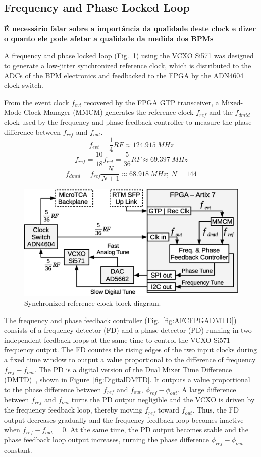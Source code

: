 \documentclass[a4paper,
               biblatex,      %
               ]{jacow}
\begin{document}
\subsection{Frequency and Phase Locked Loop}
 \textbf{É necessário falar sobre a importância da qualidade deste clock e dizer o quanto ele pode afetar a qualidade da medida dos BPMs}
 
 A frequency and phase locked loop (Fig.~\ref{fig:AFCRefClockLoop}) using the VCXO Si571 was designed to generate a low-jitter synchronized reference clock, which is distributed to the ADCs of the BPM electronics and feedbacked to the FPGA by the ADN4604 clock switch.

From the event clock $f_{evt}$ recovered by the FPGA GTP transceiver, a Mixed-Mode Clock Manager (MMCM) generates the reference clock $f_{ref}$ and the $f_{dmtd}$ clock used by the frequency and phase feedback controller to measure the phase difference between $f_{ref}$ and $f_{out}$.
\[f_{evt} = \frac{1}{4}RF \approx 124.915~MHz\]
\[f_{ref} = \frac{10}{18}f_{evt} = \frac{5}{36}RF \approx 69.397~MHz\]
\[f_{dmtd} = f_{ref}\frac{N}{N+1} \approx 68.918~MHz;~N=144\]

\begin{figure}[!htb]
   \centering
   \includegraphics*[width=0.8\columnwidth]{AFCRefClockLoop}
   \caption{Synchronized reference clock block diagram.}
   \label{fig:AFCRefClockLoop}
\end{figure}

The frequency and phase feedback controller (Fig.~\ref{fig:AFCFPGADMTD}) consists of a frequency detector (FD) and a phase detector (PD) running in two independent feedback loops at the same time to control the VCXO Si571 frequency output. The FD countes the rising edges of the two input clocks during a fixed time window to output a value proportional to the difference of frequency $f_{ref}-f_{out}$. The PD is a digital version of the Dual Mixer Time Difference (DMTD)~\cite{allan1975picosecond}, shown in Figure~\ref{fig:DigitalDMTD}. It outputs a value proportional to the phase difference between $f_{ref}$ and $f_{out}$, $\phi_{ref}-\phi_{out}$. A large difference between $f_{ref}$ and $f_{out}$ turns the PD output negligible and the VCXO is driven by the frequency feedback loop, thereby moving $f_{ref}$ toward $f_{out}$. Thus, the FD output decreases gradually and the frequency feedback loop becomes inactive when $f_{ref}-f_{out}=0$. At the same time, the PD output becomes stable and the phase feedback loop output increases, turning the phase difference $\phi_{ref}-\phi_{out}$ constant.
\end{document}

